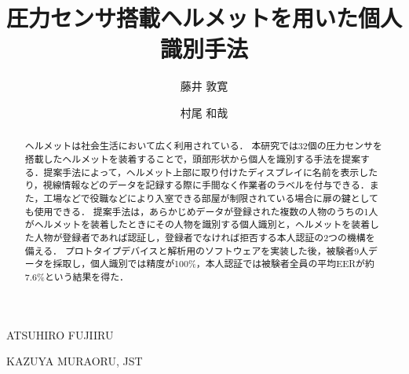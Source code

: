 \documentclass[Japanese,noauthor]{dicomopapers}
\begin{document}
\title{圧力センサ搭載ヘルメットを用いた個人識別手法}


\author{藤井 敦寛}{ATSUHIRO FUJII}{RU}
\author{村尾 和哉}{KAZUYA MURAO}{RU, JST}

\begin{abstract}
ヘルメットは社会生活において広く利用されている．
本研究では32個の圧力センサを搭載したヘルメットを装着することで，頭部形状から個人を識別する手法を提案する．提案手法によって，ヘルメット上部に取り付けたディスプレイに名前を表示したり，視線情報などのデータを記録する際に手間なく作業者のラベルを付与できる．また，工場などで役職などにより入室できる部屋が制限されている場合に扉の鍵としても使用できる．
提案手法は，あらかじめデータが登録された複数の人物のうちの1人がヘルメットを装着したときにその人物を識別する個人識別と，ヘルメットを装着した人物が登録者であれば認証し，登録者でなければ拒否する本人認証の2つの機構を備える．
プロトタイプデバイスと解析用のソフトウェアを実装した後，被験者9人データを採取し，個人識別では精度が100\%，本人認証では被験者全員の平均EERが約7.6\%という結果を得た．
\end{abstract}
\end{document}
